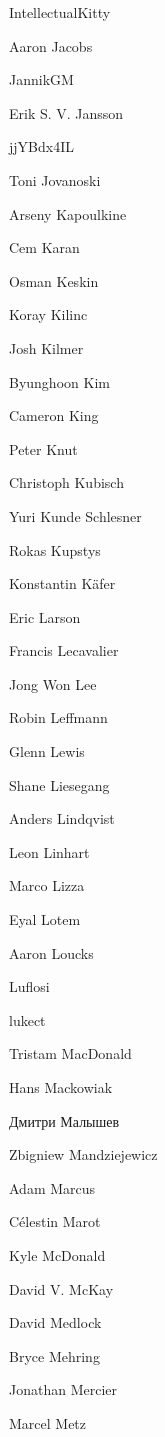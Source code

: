 \begin{DoxyItemize}
\item Intellectual\+Kitty
\item Aaron Jacobs
\item Jannik\+GM
\item Erik S. V. Jansson
\item jj\+YBdx4\+IL
\item Toni Jovanoski
\item Arseny Kapoulkine
\item Cem Karan
\item Osman Keskin
\item Koray Kilinc
\item Josh Kilmer
\item Byunghoon Kim
\item Cameron King
\item Peter Knut
\item Christoph Kubisch
\item Yuri Kunde Schlesner
\item Rokas Kupstys
\item Konstantin Käfer
\item Eric Larson
\item Francis Lecavalier
\item Jong Won Lee
\item Robin Leffmann
\item Glenn Lewis
\item Shane Liesegang
\item Anders Lindqvist
\item Leon Linhart
\item Marco Lizza
\item Eyal Lotem
\item Aaron Loucks
\item Luflosi
\item lukect
\item Tristam Mac\+Donald
\item Hans Mackowiak
\item Дмитри Малышев
\item Zbigniew Mandziejewicz
\item Adam Marcus
\item Célestin Marot
\item Kyle Mc\+Donald
\item David V. Mc\+Kay
\item David Medlock
\item Bryce Mehring
\item Jonathan Mercier
\item Marcel Metz

\end{DoxyItemize}
